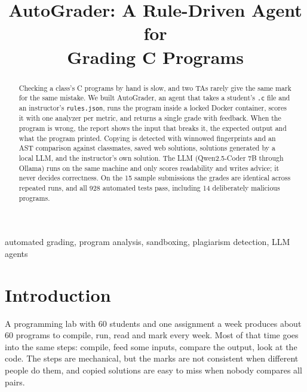 \documentclass[conference]{IEEEtran}
\newcommand{\code}[1]{\texttt{#1}}
\begin{document}
\title{AutoGrader: A Rule-Driven Agent for\\Grading C Programs}

\author{
}

\maketitle

\begin{abstract}
Checking a class's C programs by hand is slow, and two TAs rarely give the same mark for the
same mistake. We built AutoGrader, an agent that takes a student's \code{.c} file and an
instructor's \code{rules.json}, runs the program inside a locked Docker container, scores it
with one analyzer per metric, and returns a single grade with feedback. When the program is
wrong, the report shows the input that breaks it, the expected output and what the program
printed. Copying is detected with winnowed fingerprints and an AST comparison against
classmates, saved web solutions, solutions generated by a local LLM, and the instructor's own
solution. The LLM (Qwen2.5-Coder 7B through Ollama) runs on the same machine and only scores
readability and writes advice; it never decides correctness. On the 15 sample submissions the
grades are identical across repeated runs, and all 928 automated tests pass, including 14
deliberately malicious programs.
\end{abstract}

\begin{IEEEkeywords}
automated grading, program analysis, sandboxing, plagiarism detection, LLM agents
\end{IEEEkeywords}

\section{Introduction}
A programming lab with 60 students and one assignment a week produces about 60 programs to
compile, run, read and mark every week. Most of that time goes into the same steps: compile,
feed some inputs, compare the output, look at the code. The steps are mechanical, but the
marks are not consistent when different people do them, and copied solutions are easy to miss
when nobody compares all pairs.
\end{document}
